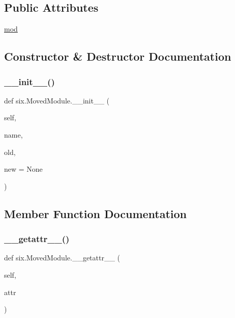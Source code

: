 \subsection*{Public Attributes}
\begin{DoxyCompactItemize}
\item 
\hyperlink{classsix_1_1MovedModule_a5eb73a4cdceda205a0342cadabce63d9}{mod}
\end{DoxyCompactItemize}


\subsection{Constructor \& Destructor Documentation}
\mbox{\label{classsix_1_1MovedModule_a72f33b603c6902f008c2f067b9096268}} 
\subsubsection{\texorpdfstring{\+\_\+\+\_\+init\+\_\+\+\_\+()}{\_\_init\_\_()}}
{\footnotesize\ttfamily def six.\+Moved\+Module.\+\_\+\+\_\+init\+\_\+\+\_\+ (\begin{DoxyParamCaption}\item[{}]{self,  }\item[{}]{name,  }\item[{}]{old,  }\item[{}]{new = {\ttfamily None} }\end{DoxyParamCaption})}



\subsection{Member Function Documentation}
\mbox{\label{classsix_1_1MovedModule_a4ae5456b2eacd57cc5440f3cf9a2276b}} 
\subsubsection{\texorpdfstring{\+\_\+\+\_\+getattr\+\_\+\+\_\+()}{\_\_getattr\_\_()}}
{\footnotesize\ttfamily def six.\+Moved\+Module.\+\_\+\+\_\+getattr\+\_\+\+\_\+ (\begin{DoxyParamCaption}\item[{}]{self,  }\item[{}]{attr }\end{DoxyParamCaption})}



